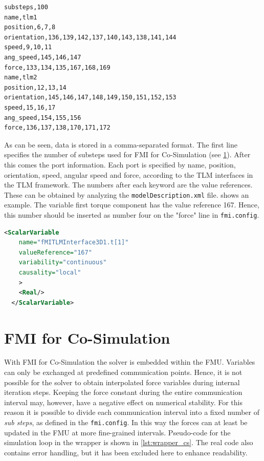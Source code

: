 \documentclass[a4paper,12pt]{include/opencpsreport}
\begin{document}
\begin{lstlisting}[language=fmiconfig,basicstyle=\ttfamily,floatplacement=ht,caption=A configuration file maps value references to TLM variables,label=lst:fmiconfig]
substeps,100
name,tlm1
position,6,7,8
orientation,136,139,142,137,140,143,138,141,144
speed,9,10,11
ang_speed,145,146,147
force,133,134,135,167,168,169
name,tlm2
position,12,13,14
orientation,145,146,147,148,149,150,151,152,153
speed,15,16,17
ang_speed,154,155,156
force,136,137,138,170,171,172
\end{lstlisting}
\newpage
As can be seen, data is stored in a comma-separated format.
The first line specifies the number of substeps used for FMI for Co-Simulation (see \cref{sec:fmi_cs}).
After this comes the port information.
Each port is specified by name, position, orientation, speed, angular speed and force, according to the TLM interfaces in the TLM framework.
The numbers after each keyword are the value references.
These can be obtained by analyzing the \texttt{modelDescription.xml} file.
 shows an example.
The variable first torque component has the value reference 167.
Hence, this number should be inserted as number four on the "force" line in \texttt{fmi.config}.

\begin{lstlisting}[language=XML,float,floatplacement=ht,caption=Value references for variables are obtained from \texttt{modelDescription.xml},label=lst:modeldescription]
  <ScalarVariable
    name="fMITLMInterface3D1.t[1]"
    valueReference="167"
    variability="continuous"
    causality="local"
    >
    <Real/>
  </ScalarVariable>
\end{lstlisting}


\clearpage
\section{FMI for Co-Simulation}
\label{sec:fmi_cs}
With FMI for Co-Simulation the solver is embedded within the FMU.
Variables can only be exchanged at predefined communication points.
Hence, it is not possible for the solver to obtain interpolated force variables during internal iteration steps.
Keeping the force constant during the entire communication interval may, however, have a negative effect on numerical stability.
For this reason it is possible to divide each communication interval into a fixed number of \textit{sub steps}, as defined in the \texttt{fmi.config}.
In this way the forces can at least be updated in the FMU at more fine-grained intervals.
Pseudo-code for the simulation loop in the wrapper is shown in \cref{lst:wrapper_cs}.
The real code also contains error handling, but it has been excluded here to enhance readability.
\end{document}
